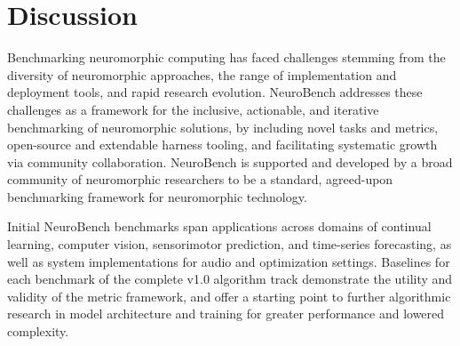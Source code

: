 
\section*{Discussion} %

Benchmarking neuromorphic computing has faced challenges stemming from the diversity of neuromorphic approaches, the range of implementation and deployment tools, and rapid research evolution.
NeuroBench addresses these challenges as a framework for the inclusive, actionable, and iterative benchmarking of neuromorphic solutions, by including novel tasks and metrics, open-source and extendable harness tooling, and facilitating systematic growth via community collaboration. NeuroBench is supported and developed by a broad community of neuromorphic researchers to be a standard, agreed-upon benchmarking framework for neuromorphic technology.

Initial NeuroBench benchmarks span applications across domains of continual learning, computer vision, sensorimotor prediction, and time-series forecasting, as well as system implementations for audio and optimization settings. Baselines for each benchmark of the complete v1.0 algorithm track demonstrate the utility and validity of the metric framework, and offer a starting point to further algorithmic research in model architecture and training for greater performance and lowered complexity. 


